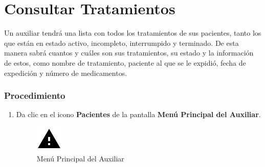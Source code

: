 \section{Consultar Tratamientos}

Un auxiliar tendrá una lista con todos los tratamientos de sus pacientes, tanto los que están en estado activo, incompleto, interrumpido y terminado. De esta manera sabrá cuantos y cuáles son sus tratamientos, su estado y la información de estos, como nombre de tratamiento, paciente al que se le expidió, fecha de expedición y número de medicamentos.

\subsubsection{Procedimiento}
\begin{enumerate}
	
	\item Da clic en el icono \textbf{Pacientes} de la pantalla \textbf{Menú Principal del Auxiliar}.

		\begin{figure}[!htbp]			\hypertarget{fig:mpAuxiliar3}{\hspace{1pt}}
		\begin{center}
			\includegraphics[height=0.4\textheight]{images/Iconos/Advertencia}
			\caption{Menú Principal del Auxiliar}
			\label{fig:mpAuxiliar3}
		\end{center}
	\end{figure}


\end{enumerate}
